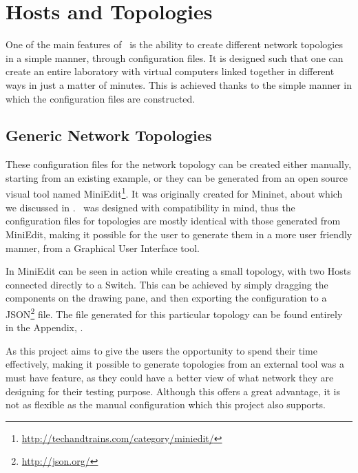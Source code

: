 \section{Hosts and Topologies}
\label{sec:hosts-and-topologies} 

One of the main features of \project\ is the ability to create different network topologies in a simple manner, through configuration files.
It is designed such that one can create an entire laboratory with virtual computers linked together in different ways in just a matter of minutes.
This is achieved thanks to the simple manner in which the configuration files are constructed.

\subsection{Generic Network Topologies}
\label{sub-sec:generic-network-topologies}

These configuration files for the network topology can be created either manually, starting from an existing example, or they can be generated from an open source visual tool named MiniEdit\footnote{\url{http://techandtrains.com/category/miniedit/}}.
It was originally created for Mininet, about which we discussed in .
\project\ was designed with compatibility in mind, thus the configuration files for topologies are mostly identical with those generated from MiniEdit, making it possible for the user to generate them in a more user friendly manner, from a Graphical User Interface tool.


In  MiniEdit can be seen in action while creating a small topology, with two Hosts connected directly to a Switch.
This can be achieved by simply dragging the components on the drawing pane, and then exporting the configuration to a JSON\footnote{\url{http://json.org/}} file.
The file generated for this particular topology can be found entirely in the Appendix, .

As this project aims to give the users the opportunity to spend their time effectively, making it possible to generate topologies from an external tool was a must have feature, as they could have a better view of what network they are designing for their testing purpose.
Although this offers a great advantage, it is not as flexible as the manual configuration which this project also supports.

